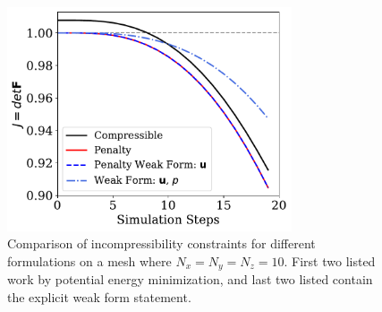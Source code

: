 \documentclass[12pt,3p]{article}
\begin{document}
\begin{figure}[!htb]
\centering
\includegraphics[width=0.75\textwidth]{./Images/FormComp_J_Nu_049}
\caption{Comparison of incompressibility constraints for different formulations on a mesh where $N_x = N_y= N_z = 10$. First two listed work by potential energy minimization, and last two listed contain the explicit weak form statement. }
\label{FigFormComp}
\end{figure}






 
\end{document}
